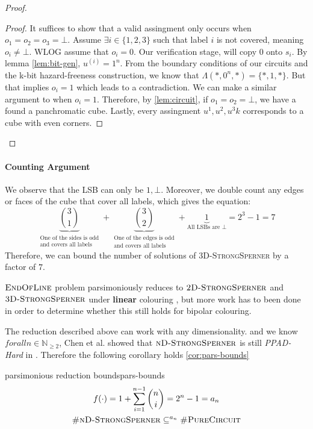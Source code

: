 \begin{proof}
\begin{proof}
    It suffices to show that a valid assingment only occurs when $o_1 = o_2 = o_3 = \bot$. Assume
    $\exists i \in \{1,2,3\}$ such that label $i$ is not covered, meaning $o_i \neq \bot$.
    WLOG assume that $o_i = 0$. Our verification stage, will copy $0$ onto $s_i$. By lemma \ref{lem:bit-gen}, $u^{(i)} = 1^n$. From the boundary
    conditions of our circuits and the k-bit hazard-freeness construction,
    we know that $\Lambda(*, 0^n, *) = \{*, 1,  *\}$. But that implies
    $o_i = 1$ which leads to a contradiction. We can make a similar argument to when $o_i = 1$.
    Therefore, by \ref{lem:circuit}, if $o_1 = o_2 = \bot$, we have a found a panchromatic
    cube. Lastly, every assingment $u^1, u^2, u^3k$  corresponds to a cube with even corners.
\end{proof}

\end{proof}
\paragraph*{Counting Argument}
We observe that the LSB can only be $1,\bot$.
Moreover, we double count any edges or faces of the cube that cover all labels, which gives the equation:
$$
\underbrace{\binom{3}{1}}_{\substack{\text{One of the sides is odd} \\ \text{and covers all labels}}}
+ \underbrace{\binom{3}{2}}_{\substack{\text{One of the edges is odd} \\ \text{and covers all labels}}}
+ \underbrace{1}_{\text{All LSBs are } \bot} = 2^3 - 1 = 7
$$
Therefore, we can bound the number of solutions of \textsc{3D-StrongSperner} by a factor of $7$.


$\textsc{EndOfLine}$ problem parsimoniously reduces to $\textsc{2D-StrongSperner}$ and $\textsc{3D-StrongSperner}$
under \textbf{linear} colouring \cite{chen_Complexity2DDiscrete_2009, daskalakis_ComplexityComputingNash_2006}, but more
work has to been done in order to determine whether this still holds for bipolar colouring.


The reduction described above can work with any dimensionality.
and we know $forall n \in \mathbb{N}_{\geq 2}$, Chen et al. showed that
$\textsc{nD-StrongSperner}$ is still \textit{PPAD-Hard} in \cite{chen_SettlingComplexityComputing_2009}.
Therefore the following corollary holds \ref{cor:pars-bounds}

\begin{corollarybox}{ parsimonious reduction bounds}{pars-bounds}
    \begin{gather*}
        f(\cdot) = 1 + \sum_{i = 1}^{n - 1}\binom{n}{i} = 2^n - 1 = a_n \\
        \textnormal{\textsc{\#nD-StrongSperner}} \subseteq^{a_n} \textnormal{\textsc{\#PureCircuit}}
    \end{gather*}
\end{corollarybox}


